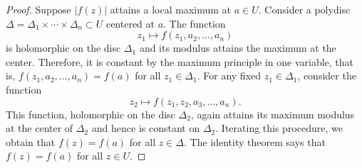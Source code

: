 \documentclass[12pt,openany]{book}
\newcommand{\sabs}[1]{\lvert {#1} \rvert}
\theoremstyle{plain}
\theoremstyle{remark}
\theoremstyle{definition}
\theoremstyle{exercise}
\theoremstyle{example}
\begin{document}
\begin{proof}
Suppose $\sabs{f(z)}$ attains a local maximum at $a \in U$.  Consider a polydisc
$\Delta = \Delta_1 \times \cdots \times \Delta_n \subset U$
centered at $a$.  The function
\begin{equation*}
z_1 \mapsto f(z_1,a_2,\ldots,a_n)
\end{equation*}
is holomorphic
on the disc $\Delta_1$ and its modulus attains the maximum
at the center.  Therefore, it is constant by the maximum principle in one variable,
that is, $f(z_1,a_2,\ldots,a_n)  = f(a)$ for all $z_1 \in \Delta_1$.  For
any fixed $z_1
\in \Delta_1$, consider the function
\begin{equation*}
z_2 \mapsto f(z_1,z_2,a_3,\ldots,a_n)  .
\end{equation*}
This function, holomorphic on the disc $\Delta_2$, again attains its maximum modulus at the center of $\Delta_2$
and hence is constant on $\Delta_2$.  Iterating this procedure, we obtain
that $f(z) = f(a)$ for all $z \in \Delta$.  The identity theorem says
that $f(z) = f(a)$ for all $z \in U$.
\end{proof}
\end{document}
